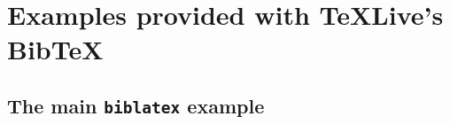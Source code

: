 \documentclass[a4paper,australian,oneside,12pt,footlines=3]{scrbook}%
\newcommand{\biblatex}{\texttt{biblatex}}
\theoremstyle{remark}
\begin{document}
\chapter{Examples provided with TeXLive's Bib\TeX{}}
\section{The main \biblatex{} example}
\begin{refsection}
	\nocite{*}
	\printbibliography[heading=subbibliography]
\end{refsection}
\printbibliography
\end{document}

